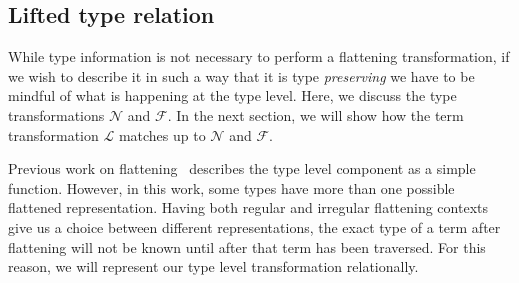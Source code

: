 







\subsection{Lifted type relation}

While type information is not necessary to perform a flattening transformation, if we wish to describe it in such a way that it is type \emph{preserving} we have to be mindful of what is happening at the type level. Here, we discuss the type transformations $\mathcal{N}$ and $\mathcal{F}$. In the next section, we will show how the term transformation $\mathcal{L}$ matches up to $\mathcal{N}$ and $\mathcal{F}$.

Previous work on flattening~\cite{Chakravarty:more-types} describes the type level component as a simple function. However, in this work, some types have more than one possible flattened representation. Having both regular and irregular flattening contexts give us a choice between different representations, the exact type of a term after flattening will not be known until after that term has been traversed. For this reason, we will represent our type level transformation relationally.

